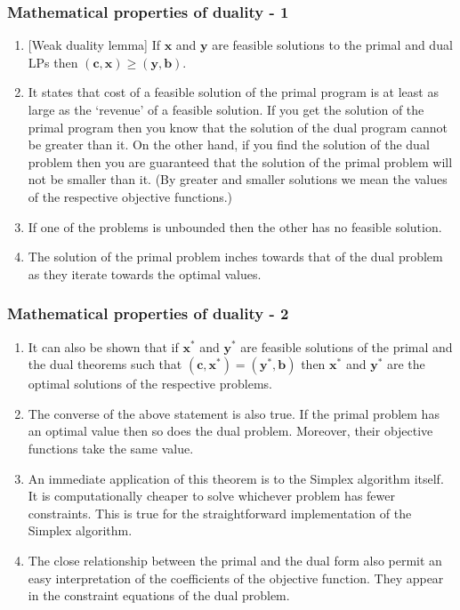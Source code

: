 \documentclass{beamer}
\begin{document}
\begin{frame}
\frametitle{Mathematical properties of duality - 1}
\begin{enumerate}
\item {[Weak duality lemma]} If $\bm{x}$ and $\bm{y}$ are feasible solutions to 
the primal and dual LPs then $(\bm{c}, \bm{x}) \ge (\bm{y}, \bm{b})$.
\item It states that cost of a feasible solution of the primal program is at 
least as large as the `revenue' of a feasible solution. If you get the solution
of the primal program then you know that the solution of the dual program
cannot be greater than it. On the other hand, if you find the solution of the
dual problem then you are guaranteed that the solution of the primal problem
will not be smaller than it. (By greater and smaller solutions we mean the 
values of the respective objective functions.)
\item If one of the problems is unbounded then the other has no feasible 
solution.
\item The solution of the primal problem inches towards that of the dual problem
as they iterate towards the optimal values.
\end{enumerate}
\end{frame}

\begin{frame}
\frametitle{Mathematical properties of duality - 2}
\begin{enumerate}
\item It can also be shown that if $\bm{x}^\ast$ and $\bm{y}^\ast$ are feasible
solutions of the primal and the dual theorems such that $(\bm{c}, \bm{x}^\ast) =
(\bm{y}^\ast, \bm{b})$ then $\bm{x}^\ast$ and $\bm{y}^\ast$ are the optimal 
solutions of the respective problems.
\item The converse of the above statement is also true. If the primal problem
has an optimal value then so does the dual problem. Moreover, their objective
functions take the same value.
\item An immediate application of this theorem is to the Simplex algorithm 
itself. It is computationally cheaper to solve whichever problem has fewer
constraints. This is true for the straightforward implementation of the Simplex
algorithm. 
\item The close relationship between the primal and the dual form also permit an
easy interpretation of the coefficients of the objective function. They appear 
in the constraint equations of the dual problem.
\end{enumerate}
\end{frame}
\end{document}
